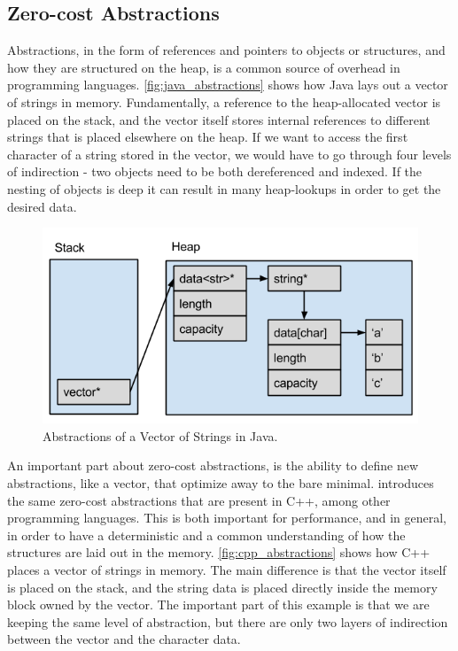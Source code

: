 \subsection{Zero-cost Abstractions}
\label{chap:zero_cost_abstractions}

Abstractions, in the form of references and pointers to objects or structures, and how they are
structured on the heap, is a common source of overhead in programming languages.
\autoref{fig:java_abstractions}  shows how Java lays out a vector of
strings in memory.
Fundamentally, a reference to the heap-allocated vector is placed on the stack, and the vector itself stores internal references to different strings that is placed elsewhere on the heap.
If we want to access the first character of a string stored in the vector, we would have to go through four levels of indirection - two objects need to be both dereferenced and indexed.
If the nesting of objects is deep it can result in many heap-lookups in order to get the desired data.

\begin{figure}[tb]
  \begin{center}
    \includegraphics[scale=0.5]{figures/java_abstractions}
  \end{center}
  \caption{Abstractions of a Vector of Strings in Java.}
  \label{fig:java_abstractions}
\end{figure}

An important part about zero-cost abstractions, is the ability to define new abstractions, like a vector, that optimize away to the bare minimal.
\rust introduces the same zero-cost abstractions that are present in C++, among other programming languages.
This is both important for performance, and in general, in order to have a deterministic and a common understanding of how the structures are laid out in the memory.
\autoref{fig:cpp_abstractions} shows how C++ places a vector of strings in memory.
The main difference is that the vector itself is placed on the stack, and the string data is placed directly inside the memory block owned by the vector.
The important part of this example is that we are keeping the same level of abstraction, but there are only two layers of indirection between the vector and the character data.

